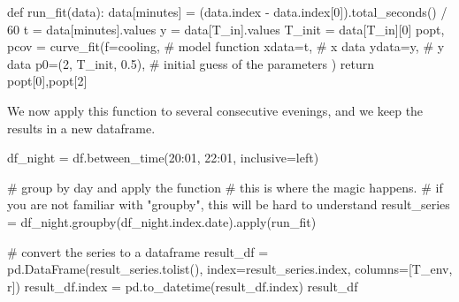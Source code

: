 \documentclass[
  letterpaper,
  DIV=11,
  numbers=noendperiod,
  oneside]{scrreprt}
\newenvironment{Shaded}{\begin{snugshade}}{\end{snugshade}}
\newcommand{\BuiltInTok}[1]{\textcolor[rgb]{0.00,0.23,0.31}{#1}}
\newcommand{\CommentTok}[1]{\textcolor[rgb]{0.37,0.37,0.37}{#1}}
\newcommand{\ControlFlowTok}[1]{\textcolor[rgb]{0.00,0.23,0.31}{#1}}
\newcommand{\DecValTok}[1]{\textcolor[rgb]{0.68,0.00,0.00}{#1}}
\newcommand{\FloatTok}[1]{\textcolor[rgb]{0.68,0.00,0.00}{#1}}
\newcommand{\KeywordTok}[1]{\textcolor[rgb]{0.00,0.23,0.31}{#1}}
\newcommand{\NormalTok}[1]{\textcolor[rgb]{0.00,0.23,0.31}{#1}}
\newcommand{\OperatorTok}[1]{\textcolor[rgb]{0.37,0.37,0.37}{#1}}
\newcommand{\StringTok}[1]{\textcolor[rgb]{0.13,0.47,0.30}{#1}}
\begin{document}
\begin{Shaded}
\begin{Highlighting}[]
\KeywordTok{def}\NormalTok{ run\_fit(data):}
\NormalTok{    data[}\StringTok{\textquotesingle{}minutes\textquotesingle{}}\NormalTok{] }\OperatorTok{=}\NormalTok{ (data.index }\OperatorTok{{-}}\NormalTok{ data.index[}\DecValTok{0}\NormalTok{]).total\_seconds() }\OperatorTok{/} \DecValTok{60}
\NormalTok{    t }\OperatorTok{=}\NormalTok{ data[}\StringTok{\textquotesingle{}minutes\textquotesingle{}}\NormalTok{].values}
\NormalTok{    y }\OperatorTok{=}\NormalTok{ data[}\StringTok{\textquotesingle{}T\_in\textquotesingle{}}\NormalTok{].values}
\NormalTok{    T\_init }\OperatorTok{=}\NormalTok{ data[}\StringTok{\textquotesingle{}T\_in\textquotesingle{}}\NormalTok{][}\DecValTok{0}\NormalTok{]}
\NormalTok{    popt, pcov }\OperatorTok{=}\NormalTok{ curve\_fit(f}\OperatorTok{=}\NormalTok{cooling,             }\CommentTok{\# model function}
\NormalTok{                        xdata}\OperatorTok{=}\NormalTok{t,              }\CommentTok{\# x data}
\NormalTok{                        ydata}\OperatorTok{=}\NormalTok{y,              }\CommentTok{\# y data}
\NormalTok{                        p0}\OperatorTok{=}\NormalTok{(}\DecValTok{2}\NormalTok{, T\_init, }\FloatTok{0.5}\NormalTok{),   }\CommentTok{\# initial guess of the parameters}
\NormalTok{                        )}
    \ControlFlowTok{return}\NormalTok{ popt[}\DecValTok{0}\NormalTok{],popt[}\DecValTok{2}\NormalTok{]}
\end{Highlighting}
\end{Shaded}

We now apply this function to several consecutive evenings, and we keep
the results in a new dataframe.

\begin{Shaded}
\begin{Highlighting}[]
\NormalTok{df\_night }\OperatorTok{=}\NormalTok{ df.between\_time(}\StringTok{\textquotesingle{}20:01\textquotesingle{}}\NormalTok{, }\StringTok{\textquotesingle{}22:01\textquotesingle{}}\NormalTok{, inclusive}\OperatorTok{=}\StringTok{\textquotesingle{}left\textquotesingle{}}\NormalTok{)}

\CommentTok{\# group by day and apply the function}
\CommentTok{\# this is where the magic happens.}
\CommentTok{\# if you are not familiar with "groupby", this will be hard to understand}
\NormalTok{result\_series }\OperatorTok{=}\NormalTok{ df\_night.groupby(df\_night.index.date).}\BuiltInTok{apply}\NormalTok{(run\_fit)}

\CommentTok{\# convert the series to a dataframe}
\NormalTok{result\_df }\OperatorTok{=}\NormalTok{ pd.DataFrame(result\_series.tolist(), index}\OperatorTok{=}\NormalTok{result\_series.index, columns}\OperatorTok{=}\NormalTok{[}\StringTok{\textquotesingle{}T\_env\textquotesingle{}}\NormalTok{, }\StringTok{\textquotesingle{}r\textquotesingle{}}\NormalTok{])}
\NormalTok{result\_df.index }\OperatorTok{=}\NormalTok{ pd.to\_datetime(result\_df.index)}
\NormalTok{result\_df}
\end{Highlighting}
\end{Shaded}
\end{document}

